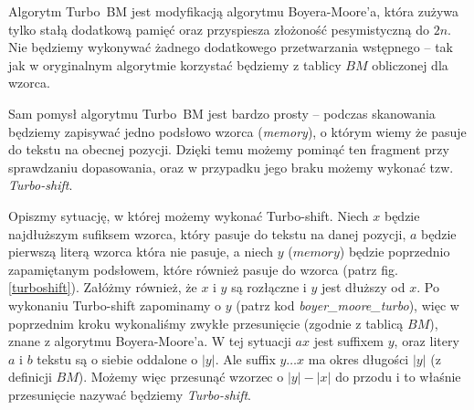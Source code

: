 Algorytm Turbo~BM jest modyfikacją algorytmu Boyera-Moore'a, która zużywa tylko stałą dodatkową pamięć oraz przyspiesza złożoność pesymistyczną do $2n$. Nie będziemy wykonywać żadnego dodatkowego przetwarzania wstępnego -- tak jak w oryginalnym algorytmie korzystać będziemy z tablicy $BM$ obliczonej dla wzorca.
  
Sam pomysł algorytmu Turbo~BM jest bardzo prosty -- podczas skanowania będziemy zapisywać jedno podsłowo wzorca (\emph{memory}), o którym wiemy że pasuje do tekstu na obecnej pozycji. Dzięki temu możemy pominąć ten fragment przy sprawdzaniu dopasowania, oraz w przypadku jego braku możemy wykonać tzw. \emph{Turbo-shift}.

Opiszmy sytuację, w której możemy wykonać Turbo-shift. Niech $x$ będzie najdłuższym sufiksem wzorca, który pasuje do tekstu na danej pozycji, $a$ będzie pierwszą literą wzorca która nie pasuje, a niech $y$ ($memory$) będzie poprzednio zapamiętanym podsłowem, które również pasuje do wzorca (patrz fig. \ref{turboshift}). Załóżmy również, że $x$ i $y$ są rozłączne i $y$ jest dłuższy od $x$. Po wykonaniu Turbo-shift zapominamy o $y$ (patrz kod \emph{boyer\_moore\_turbo}), więc w poprzednim kroku wykonaliśmy zwykłe przesunięcie (zgodnie z tablicą $BM$), znane z algorytmu Boyera-Moore'a. W tej sytuacji $ax$ jest suffixem $y$, oraz litery $a$ i $b$ tekstu są o siebie oddalone o $|y|$. Ale suffix $y\ldots x$ ma okres długości $|y|$ (z definicji $BM$). Możemy więc przesunąć wzorzec o $|y| - |x|$ do przodu i to właśnie przesunięcie nazywać będziemy \emph{Turbo-shift}.

